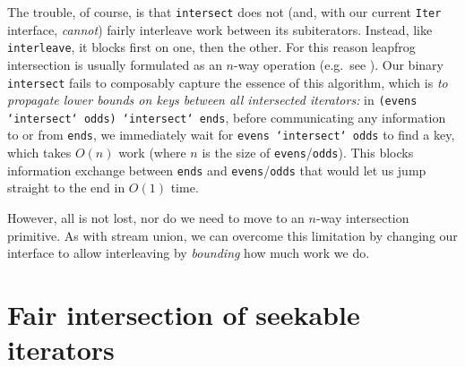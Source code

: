 \documentclass[acmsmall,screen,review,anonymous,dvipsnames,svgnames]{acmart}
\newcommand\hask[1]{\texttt{#1}}
\newcommand\ttt\texttt
\begin{document}
The trouble, of course, is that \ttt{intersect} does not (and, with our current \hask{Iter} interface, \emph{cannot}) fairly interleave work between its subiterators.
Instead, like \ttt{interleave}, it blocks first on one, then the other.
For this reason leapfrog intersection is usually formulated as an $n$-way operation (e.g.\ see \citet{lftj}).
Our binary \ttt{intersect} fails to composably capture the essence of this algorithm, which is \emph{to propagate lower bounds on keys between all intersected iterators:}
in \ttt{(evens `intersect` odds) `intersect` ends}, before communicating any information to or from \ttt{ends}, we immediately wait for \ttt{evens `intersect` odds} to find a key, which takes $O(n)$ work (where $n$ is the size of \ttt{evens}/\ttt{odds}).
This blocks information exchange between \ttt{ends} and \ttt{evens}/\ttt{odds} that would let us jump straight to the end in $O(1)$ time.

However, all is not lost, nor do we need to move to an $n$-way intersection primitive.
As with stream union, we can overcome this limitation by changing our interface to allow interleaving by \emph{bounding} how much work we do.


\section{Fair intersection of seekable iterators}
\end{document}
